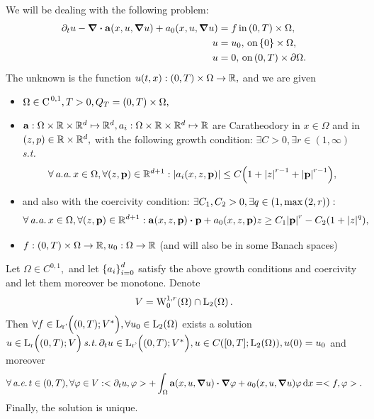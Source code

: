\documentclass{article}
\begin{document}
We will be dealing with the following problem:
\begin{align}
	\label{eq:nonlin_parab}
	\partial_t u - \divergence{\vb{a}\qty(x, u, \grad u)}+ a_0\qty(x, u, \grad u) &= f \, \text{in} \, (0,T) \times \Omega, \\
	u &= u_0, \, \text{on} \, \{0\} \times \Omega, \\
	u &= 0, \, \text{on} \, (0,T) \times \partial \Omega.
\end{align}
The unknown is the function $u(t,x): \qty(0,T) \times \Omega \to {\mathbb R},$ and we are given
\begin{itemize}
	\item $\Omega \in \text{C}^{\!\,\, 0,1},T >0, Q_T = \qty(0,T) \times \Omega,$
	\item $\vb{a}:\Omega \times {\mathbb R} \times {\mathbb R}^d \mapsto {\mathbb R}^d, a_i: \Omega \times {\mathbb R} \times {\mathbb R}^d \mapsto {\mathbb R}$ are Caratheodory in $x \in \Omega$ and in $(z, p) \in {\mathbb R} \times {\mathbb R}^d,$ with the following growth condition: $\exists C>0, \exists r\in (1, \infty)$ \textit{s.t.}
		\[
			\forall \, \text{\textit{a.a.}} \, x \in \Omega, \forall (z,\vb{p}) \in {\mathbb R}^{d+1}: \abs{a_i\qty(x, z, \vb{p})} \leq C\qty(1+ \abs{z}^{r-1}+ \abs{\vb{p}}^{r-1}),
		\]
	\item and also with the coercivity condition: $\exists C_1, C_2 >0, \exists q \in \qty(1, \max\qty(2,r)):$
		\[
			\forall \, \text{\textit{a.a.}} \, x \in \Omega, \forall \qty(z, \vb{p}) \in \R^{d+1}: \vb{a}\qty(x,z,\vb{p}) \vdot \vb{p} + a_0\qty(x,z,\vb{p})z \geq C_1\abs{\vb{p}}^r - C_2\qty(1+\abs{z}^q),
		\]
	\item $f: \qty(0,T) \times \Omega \to {\mathbb R}, u_0: \Omega \to {\mathbb R}$ (and will also be in some Banach spaces)

\end{itemize}

\begin{theorem}
	Let $\Omega \in C^{0,1},$ and let  $\qty{a_i}_{i=0}^d$ satisfy the above growth conditions and coercivity and let them moreover be monotone. Denote
	\[
		V = \WkpzeroSet[1][r]{\Omega} \cap \LpSet[2]{\Omega}.
	\]
	Then $\forall f \in \LpIntX{r'}{0}{T}{V^{*}}, \forall u_0 \in \LpSet[2]{\Omega}$ exists  a solution $u \in  \LpIntX{r}{0}{T}{V} \, \text{\textit{s.t.}} \, \partial_t u \in \LpIntX{r'}{0}{T}{V^{*}}, u \in C\qty([0,T]; \LpSet[2]{\Omega}), u(0) = u_0$ and moreover
	\[
		\forall	\, \text{\textit{a.e.}} \,t \in (0,T), \forall \varphi \in V: <\partial_t u, \varphi> + \int_{\Omega}\vb{a}\qty(x, u, \grad u) \vdot \grad \varphi + a_0\qty(x, u, \grad u)\varphi\dd{x} = <f, \varphi>.
	\]
	Finally, the solution is unique.
\end{theorem}
\end{document}
